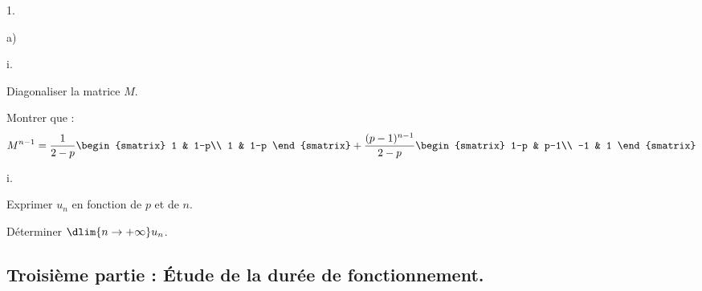\begin{noliste}{1.}
\begin{noliste}{a)}
    
    
  \item 
    \begin{nonoliste}{i.}
    \item Diagonaliser la matrice $M$.
      
      
      
    \item Montrer que :
      \[
      M^{n-1}=\dfrac{1}{2-p}
      \begin{smatrix} 
        1 & 1-p\\
        1 & 1-p
      \end{smatrix}
      + \dfrac{(p-1)^{n-1}}{2-p}
      \begin{smatrix} 
        1-p & p-1\\
        -1 & 1 
      \end{smatrix}
      \]

      

    \end{nonoliste}
    
  \item 
    \begin{nonoliste}{i.}
    \item Exprimer $u_n$ en fonction de $p$ et de $n$. 

      

    \item Déterminer $\dlim{n \to +\infty} u_n$. 

      

    \end{nonoliste}
  \end{noliste}
\end{noliste}

\subsection*{Troisième partie : Étude de la durée de fonctionnement.}

